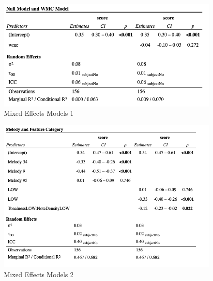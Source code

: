 \documentclass[12pt,]{book}
\begin{document}
\begin{figure}

{\centering \includegraphics[width=1\linewidth]{img/metable1} 

}

\caption{Mixed Effects Models 1}\label{fig:metable1}
\end{figure}

\begin{figure}

{\centering \includegraphics[width=1\linewidth]{img/metable2} 

}

\caption{Mixed Effects Models 2}\label{fig:metable2}
\end{figure}
\end{document}
